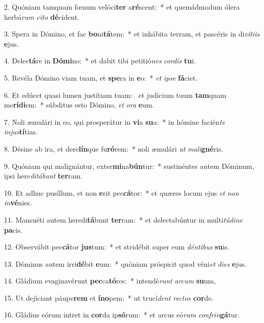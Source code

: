 2. Quóniam tamquam fœnum velóci\textbf{ter} a\textbf{ré}scent:~*  et quemádmodum ólera herbá\textit{rum} \textit{ci}\textit{to} \textbf{dé}cident.\

3. Spera in Dómino, et fac \textbf{bo}ni\textbf{tá}tem:~*  et inhábita terram, et pascéris in di\textit{ví}\textit{ti}\textit{is} \textbf{e}jus.\

4. Delec\textbf{tá}re in \textbf{Dó}\textbf{mi}no:~*  et dabit tibi petitió\textit{nes} \textit{cor}\textit{dis} \textbf{tu}i.\

5. Revéla Dómino viam tuam, et \textbf{spe}ra in \textbf{e}o:~*  \textit{et} \textit{ip}\textit{se} \textbf{fá}ciet.\

6. Et edúcet quasi lumen justítiam tuam: \dag\  et judícium tuum \textbf{tam}quam me\textbf{rí}\textbf{di}em:~*  súbditus esto Dómino, \textit{et} \textit{o}\textit{ra} \textbf{e}um.\

7. Noli æmulári in eo, qui prosperátur in \textbf{vi}a \textbf{su}a:~*  in hómine facién\textit{te} \textit{in}\textit{jus}\textbf{tí}tias.\

8. Désine ab ira, et dere\textbf{lín}que fu\textbf{ró}rem:~*  noli æmulári \textit{ut} \textit{ma}\textit{li}\textbf{gné}ris.\

9. Quóniam qui malignántur, exter\textbf{mi}na\textbf{bún}tur:~*  sustinéntes autem Dóminum, ipsi here\textit{di}\textit{tá}\textit{bunt} \textbf{ter}ram.\

10. Et adhuc pusíllum, et non \textbf{e}rit pec\textbf{cá}tor:~*  et quæres locum ejus \textit{et} \textit{non} \textit{in}\textbf{vé}nies.\

11. Mansuéti autem heredi\textbf{tá}bunt \textbf{ter}ram:~*  et delectabúntur in multi\textit{tú}\textit{di}\textit{ne} \textbf{pa}cis.\

12. Observábit pec\textbf{cá}tor \textbf{jus}tum:~*  et stridébit super eum \textit{dén}\textit{ti}\textit{bus} \textbf{su}is.\

13. Dóminus autem irri\textbf{dé}bit \textbf{e}um:~*  quóniam próspicit quod véni\textit{et} \textit{di}\textit{es} \textbf{e}jus.\

14. Gládium evaginavérunt \textbf{pec}ca\textbf{tó}res:~*  intendé\textit{runt} \textit{ar}\textit{cum} \textbf{su}um,\

15. Ut dejíciant páupe\textbf{rem} et \textbf{ín}\textbf{o}pem:~*  ut trucí\textit{dent} \textit{rec}\textit{tos} \textbf{cor}de.\

16. Gládius eórum intret in \textbf{cor}da ip\textbf{só}rum:~*  et arcus eó\textit{rum} \textit{con}\textit{frin}\textbf{gá}tur.\

